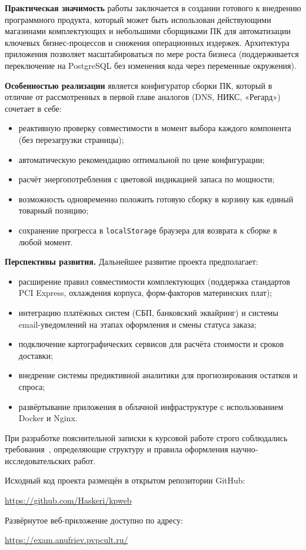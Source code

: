 \textbf{Практическая значимость} работы заключается в создании готового к внедрению программного продукта, который может быть использован действующими магазинами комплектующих и небольшими сборщиками ПК для автоматизации ключевых бизнес-процессов и снижения операционных издержек. Архитектура приложения позволяет масштабироваться по мере роста бизнеса (поддерживается переключение на PostgreSQL без изменения кода через переменные окружения).

\textbf{Особенностью реализации} является конфигуратор сборки ПК, который в отличие от рассмотренных в первой главе аналогов (DNS, НИКС, «Регард») сочетает в себе:
\begin{itemize}
    \item реактивную проверку совместимости в момент выбора каждого компонента (без перезагрузки страницы);
    \item автоматическую рекомендацию оптимальной по цене конфигурации;
    \item расчёт энергопотребления с цветовой индикацией запаса по мощности;
    \item возможность одновременно положить готовую сборку в корзину как единый товарный позицию;
    \item сохранение прогресса в \texttt{localStorage} браузера для возврата к сборке в любой момент.
\end{itemize}

\textbf{Перспективы развития.} Дальнейшее развитие проекта предполагает:
\begin{itemize}
    \item расширение правил совместимости комплектующих (поддержка стандартов PCI Express, охлаждения корпуса, форм-факторов материнских плат);
    \item интеграцию платёжных систем (СБП, банковский эквайринг) и системы email-уведомлений на этапах оформления и смены статуса заказа;
    \item подключение картографических сервисов для расчёта стоимости и сроков доставки;
    \item внедрение системы предиктивной аналитики для прогнозирования остатков и спроса;
    \item развёртывание приложения в облачной инфраструктуре с использованием Docker и Nginx.
\end{itemize}

При разработке пояснительной записки к курсовой работе строго соблюдались требования~\cite{gost_report}, определяющие структуру и правила оформления научно-исследовательских работ.

Исходный код проекта размещён в открытом репозитории GitHub:
\begin{center}
    \url{https://github.com/Haskeri/kpweb}
\end{center}

Развёрнутое веб-приложение доступно по адресу:
\begin{center}
    \url{https://exam.anufriev.pvpcult.ru/}
\end{center}
